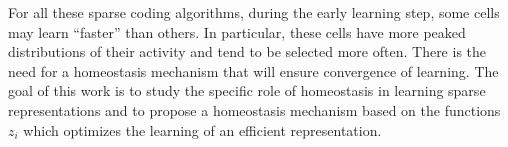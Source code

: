 \documentclass[draft]{article} %
\begin{document}
For all these sparse coding algorithms, during the early learning step, some cells may learn ``faster'' than others. In particular, these cells have more peaked distributions of their activity and tend to be selected more often. There is the need for a homeostasis mechanism that will ensure convergence of learning. The goal of this work is to study the specific role of homeostasis in learning sparse representations and to propose a homeostasis mechanism based on the functions $z_i$ which optimizes the learning of an efficient representation.%
\end{document}
